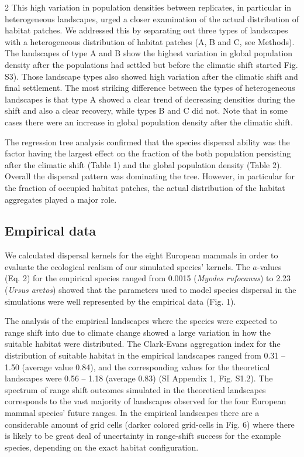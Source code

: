 \documentclass[12pt,pdftex]{article}
\begin{document}
\begin{spacing}{2}
This high variation in population densities between replicates, in particular in heterogeneous landscapes, urged a closer examination of the actual distribution of habitat patches. We addressed this by separating out three types of landscapes with a heterogeneous distribution of habitat patches (A, B and C, see Methods). The landscapes of type A and B show the highest variation in global population density after the populations had settled but before the climatic shift started Fig. S3). Those landscape types also showed high variation after the climatic shift and final settlement. The most striking difference between the types of heterogeneous landscapes is that type A showed a clear trend of decreasing densities during the shift and also a clear recovery, while types B and C did not. Note that in some cases there were an increase in global population density after the climatic shift.     


The regression tree analysis confirmed that the species dispersal ability was the factor having the largest effect on the fraction of the both population persisting after the climatic shift (Table 1) and the global population density (Table 2). Overall the dispersal pattern was dominating the tree. However, in particular for the fraction of occupied habitat patches, the actual distribution of the habitat aggregates played a major role. 

\subsection*{Empirical data}

We calculated dispersal kernels for the eight European mammals in order to evaluate the ecological realism of our simulated species' kernels. The $a$-values (Eq. 2) for the empirical species ranged from 0.0015 (\textit{Myodes rufocanus}) to 2.23 ({\em Ursus arctos}) showed that the parameters used to model species dispersal in the simulations were well represented by the empirical data (Fig. 1).

The analysis of the empirical landscapes where the species were expected to range shift into due to climate change showed a large variation in how the suitable habitat were distributed. The Clark-Evans aggregation index for the distribution of suitable habitat in the empirical landscapes ranged from 0.31 -- 1.50 (average value 0.84), and the corresponding values for the theoretical landscapes were 0.56 -- 1.18 (average 0.83) (SI Appendix 1, Fig. S1.2). The spectrum of range shift outcomes simulated in the theoretical landscapes corresponds to the vast majority of landscapes observed for the four European mammal species’ future ranges. In the empirical landscapes there are a considerable amount of grid cells  (darker colored grid-cells in Fig. 6) where there is likely to be great deal of uncertainty in range-shift success for the example species, depending on the exact habitat configuration. 


\end{spacing}
\end{document}

